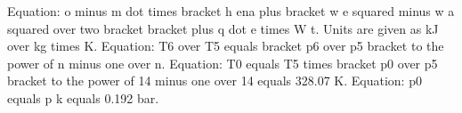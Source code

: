 Equation: o minus m dot times bracket h ena plus bracket w e squared minus w a squared over two bracket bracket plus q dot e times W t. Units are given as kJ over kg times K.
Equation: T6 over T5 equals bracket p6 over p5 bracket to the power of n minus one over n.
Equation: T0 equals T5 times bracket p0 over p5 bracket to the power of 14 minus one over 14 equals 328.07 K.
Equation: p0 equals p k equals 0.192 bar.